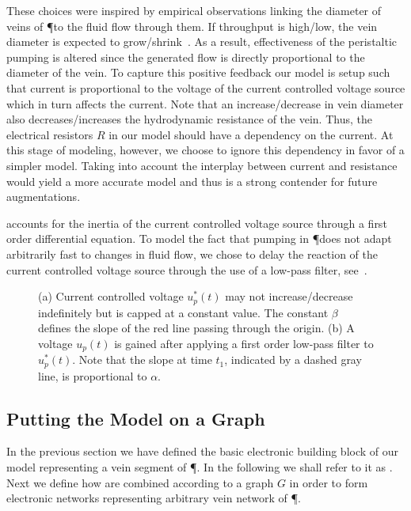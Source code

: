 These choices were inspired by empirical observations linking the diameter of veins of \P to the fluid flow through them. If throughput is high/low, the vein diameter is expected to grow/shrink~\cite{nakagaki2000intelligence}. As a result, effectiveness of the peristaltic pumping is altered since the generated flow is directly proportional to the diameter of the vein. To capture this positive feedback our model is setup such that current is proportional to the voltage of the current controlled voltage source which in turn affects the current. Note that an increase/decrease in vein diameter also decreases/increases the hydrodynamic resistance of the vein. Thus, the electrical resistors $R$ in our model should have a dependency on the current. At this stage of modeling, however, we choose to ignore this dependency in favor of a simpler model. Taking into account the interplay between current and resistance would yield a more accurate model and thus is a strong contender for future augmentations.

 accounts for the inertia of the current controlled voltage source through a first order differential equation. To model the fact that pumping in \P does not adapt arbitrarily fast to changes in fluid flow, we chose to delay the reaction of the current controlled voltage source through the use of a low-pass filter, see~.
  
\begin{figure}
    \centering
        \subfloat[]{%
    \label{fig:steady}%
    }%
    \qquad
      \subfloat[]{%
    \label{fig:transient}%
    }%
      \caption[Definitions for current controlled voltage sources]{(a) Current controlled voltage $u^*_p(t)$ may not increase/decrease indefinitely but is capped at a constant value. The constant $\beta$ defines the slope of the red line passing through the origin. (b) A voltage $u_p(t)$ is gained after applying a first order low-pass filter to $u^*_p(t)$. Note that the slope
      at time $t_1$, indicated by a dashed gray line, is proportional to $\alpha$.}
\end{figure}


\subsection{Putting the Model on a Graph}

  In the previous section we have defined the basic electronic building block of our model representing a vein segment of \P. In the following we shall refer to it as \Pe. Next we define how \Pes are combined according to a graph $G$ in order to form electronic networks representing arbitrary vein network of \P.

